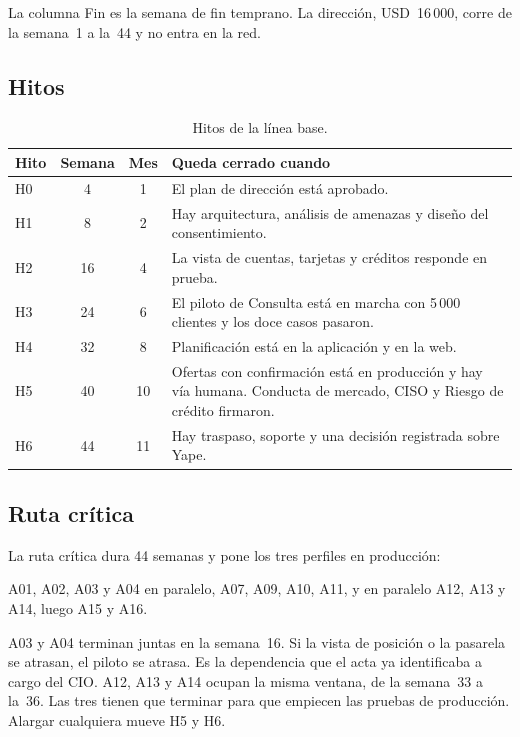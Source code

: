 \documentclass[11pt,a4paper]{article}
\newcommand{\usd}[1]{USD~#1}
\begin{document}
\noindent La columna Fin es la semana de fin temprano. La dirección, \usd{16\,000}, corre de la semana~1 a la~44 y no entra en la red.

\subsection{Hitos}

\begin{table}[H]
\centering
\caption{Hitos de la línea base.}
\small
\begin{tabularx}{\textwidth}{@{}l c c X@{}}
\toprule
\textbf{Hito} & \textbf{Semana} & \textbf{Mes} & \textbf{Queda cerrado cuando} \\
\midrule
H0 & 4 & 1 & El plan de dirección está aprobado. \\
H1 & 8 & 2 & Hay arquitectura, análisis de amenazas y diseño del consentimiento. \\
H2 & 16 & 4 & La vista de cuentas, tarjetas y créditos responde en prueba. \\
H3 & 24 & 6 & El piloto de Consulta está en marcha con 5\,000 clientes y los doce casos pasaron. \\
H4 & 32 & 8 & Planificación está en la aplicación y en la web. \\
H5 & 40 & 10 & Ofertas con confirmación está en producción y hay vía humana. Conducta de mercado, CISO y Riesgo de crédito firmaron. \\
H6 & 44 & 11 & Hay traspaso, soporte y una decisión registrada sobre Yape. \\
\bottomrule
\end{tabularx}
\end{table}

\subsection{Ruta crítica}

La ruta crítica dura 44 semanas y pone los tres perfiles en producción:

A01, A02, A03 y A04 en paralelo, A07, A09, A10, A11, y en paralelo A12, A13 y A14, luego A15 y A16.

A03 y A04 terminan juntas en la semana~16. Si la vista de posición o la pasarela se atrasan, el piloto se atrasa. Es la dependencia que el acta ya identificaba a cargo del CIO. A12, A13 y A14 ocupan la misma ventana, de la semana~33 a la~36. Las tres tienen que terminar para que empiecen las pruebas de producción. Alargar cualquiera mueve H5 y H6.
\end{document}
